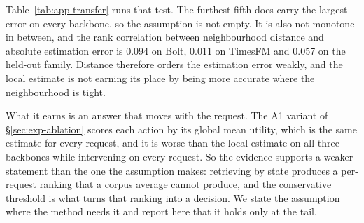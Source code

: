 \documentclass{article}
\begin{document}
Table~\ref{tab:app-transfer} runs that test. The furthest fifth does carry the largest error on
every backbone, so the assumption is not empty. It is also not monotone in between, and the
rank correlation between neighbourhood distance and absolute estimation error is
0.094 on Bolt, 0.011 on TimesFM and 0.057 on the held-out family.
Distance therefore orders the estimation error weakly, and the local estimate is not earning
its place by being more accurate where the neighbourhood is tight.

What it earns is an answer that moves with the request. The A1 variant of
\S\ref{sec:exp-ablation} scores each action by its global mean utility, which is the same
estimate for every request, and it is worse than the local estimate on all three backbones
while intervening on every request. So the evidence supports a weaker statement than the one
the assumption makes: retrieving by state produces a per-request ranking that a corpus average
cannot produce, and the conservative threshold is what turns that ranking into a decision. We
state the assumption where the method needs it and report here that it holds only at the tail.

\begin{table}[h]
  \caption{The local transfer assumption, measured. Pairs are every admissible non-reference
  action of every evaluation request, split into five bins by the mean distance of the
  neighbourhood the rule retrieved. Distance is in the standardised state space, error is
  $|\hat\mu_a - g_a|$ between the estimate the rule acted on and what the action did, and sign
  agreement is how often the two share a sign. The frozen configuration is reused and nothing
  is selected here.}
  \label{tab:app-transfer}
  \centering
  \small
  \setlength{\tabcolsep}{4pt}
\end{table}
\end{document}
